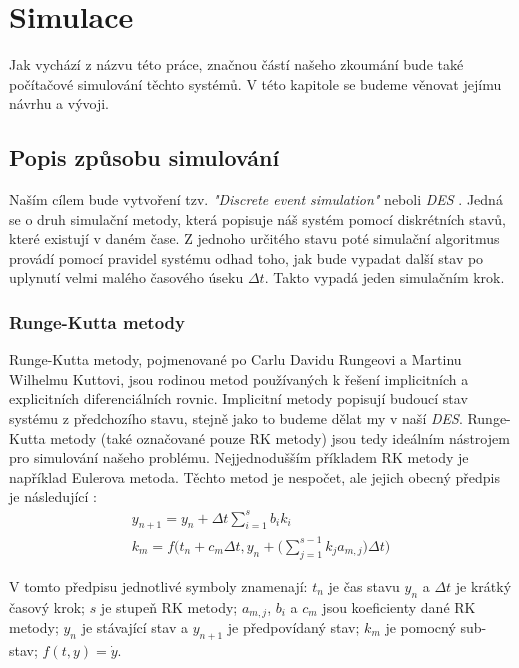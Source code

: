 \chapter{Simulace}
\label{chap:sim}

Jak vychází z názvu této práce, značnou částí našeho zkoumání bude také počítačové simulování těchto systémů. V této kapitole se budeme věnovat jejímu návrhu a vývoji.

\section{Popis způsobu simulování}

Naším cílem bude vytvoření tzv. \textit{"Discrete event simulation"} neboli \textit{DES} \cite{sim_methods}. Jedná se o druh simulační metody, která popisuje náš systém pomocí diskrétních stavů, které existují v daném čase. Z jednoho určitého stavu poté simulační algoritmus provádí pomocí pravidel systému odhad toho, jak bude vypadat další stav po uplynutí velmi malého časového úseku $\Delta t$. Takto vypadá jeden simulačním krok.

\subsection{Runge-Kutta metody}

Runge-Kutta metody, pojmenované po Carlu Davidu Rungeovi a Martinu Wilhelmu Kuttovi, jsou rodinou metod používaných k řešení implicitních a explicitních diferenciálních rovnic. Implicitní metody popisují budoucí stav systému z předchozího stavu, stejně jako to budeme dělat my v naší \textit{DES}. Runge-Kutta metody (také označované pouze RK metody) jsou tedy ideálním nástrojem pro simulování našeho problému. Nejjednodušším příkladem RK metody je například Eulerova metoda. Těchto metod je nespočet, ale jejich obecný předpis je následující \cite{RK_def}:
\begin{equation}
    \label{eq:RK_def}
    \begin{gathered}
        y_{n+1} = y_n + \Delta t \sum_{i=1}^{s} b_i k_i \\
        k_m = f \Bigg(t_n + c_m \Delta t, y_n + \Bigg(\sum_{j=1}^{s-1} k_j a_{m,j} \Bigg) \Delta t \Bigg)
    \end{gathered}
\end{equation}

V tomto předpisu jednotlivé symboly znamenají: $t_n$ je čas stavu $y_n$ a $\Delta t$ je krátký časový krok; $s$ je stupeň RK metody; $a_{m,j}$, $b_i$ a $c_m$ jsou koeficienty dané RK metody; $y_n$ je stávající stav a $y_{n+1}$ je předpovídaný stav; $k_m$ je pomocný sub-stav; $f(t,y) = \dot{y}$.

